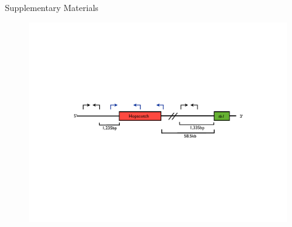 \documentclass[11pt]{article}
\newcommand{\lev}[1]{\textcolor{green}{\emph{\scriptsize #1}} }
\begin{document}
\begin{linenumbers}
\begin{flushleft}

\clearpage


Supplementary Materials
\clearpage
\setcounter{figure}{0}
\setcounter{table}{0}
\renewcommand{\figurename}{Sup.\Fig.}
\renewcommand{\tablename}{Sup.\Table}

\begin{figure}[!t]
  \begin{center}
   \includegraphics[width=150mm]{FigS1LocusCartoon.pdf}
\label{FigS1Locus}
  \end{center}
\end{figure}


\end{flushleft}
\end{linenumbers}
\end{document}
